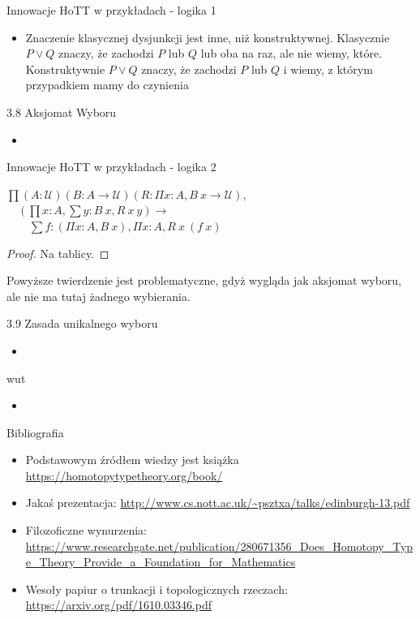 \documentclass{beamer}
\begin{document}
\begin{frame}{Innowacje HoTT w przykładach - logika 1}
\begin{itemize}
	\item Znaczenie klasycznej dysjunkcji jest inne, niż konstruktywnej. Klasycznie $P \lor Q$ znaczy, że zachodzi $P$ lub $Q$ lub oba na raz, ale nie wiemy, które. Konstruktywnie $P \lor Q$ znaczy, że zachodzi $P$ lub $Q$ i wiemy, z którym przypadkiem mamy do czynienia
\end{itemize}
\end{frame}

\begin{frame}{3.8 Aksjomat Wyboru}
\begin{itemize}
	\item
\end{itemize}
\end{frame}

\begin{frame}{Innowacje HoTT w przykładach - logika 2}
\begin{theorem}
$\textstyle \prod (A : \mathcal{U}) (B : A \to \mathcal{U}) (R : \Pi x : A, B\ x \to \mathcal{U}),$ \\
	$\textstyle \quad (\prod x : A, \sum y : B\ x, R\ x\ y) \to$ \\
		$\textstyle \qquad \sum f : (\Pi x : A, B\ x), \Pi x : A, R\ x\ (f\ x)$
\end{theorem}
\begin{proof}
	Na tablicy.
\end{proof}

Powyższe twierdzenie jest problematyczne, gdyż wygląda jak aksjomat wyboru, ale nie ma tutaj żadnego wybierania.

\end{frame}

\begin{frame}{3.9 Zasada unikalnego wyboru}
\begin{itemize}
	\item
\end{itemize}
\end{frame}

\begin{frame}{wut}
\begin{itemize}
	\item
\end{itemize}
\end{frame}

\begin{frame}{Bibliografia}
\begin{itemize}
	\item Podstawowym źródłem wiedzy jest książka \url{https://homotopytypetheory.org/book/}
	\item Jakaś prezentacja: \url{http://www.cs.nott.ac.uk/~psztxa/talks/edinburgh-13.pdf}
	\item Filozoficzne wynurzenia: \url{https://www.researchgate.net/publication/280671356_Does_Homotopy_Type_Theory_Provide_a_Foundation_for_Mathematics}
	\item Wesoły papiur o trunkacji i topologicznych rzeczach: \url{https://arxiv.org/pdf/1610.03346.pdf}
\end{itemize}
\end{frame}
\end{document}
